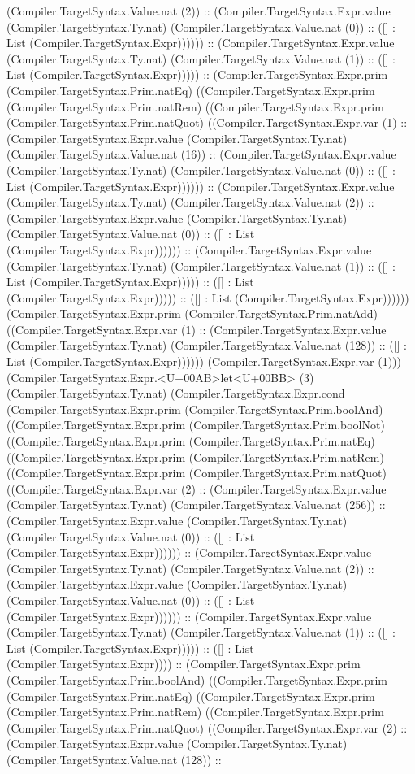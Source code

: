 \documentclass[11pt]{article}
\begin{document}
(Compiler.TargetSyntax.Value.nat (2)) :: (Compiler.TargetSyntax.Expr.value (Compiler.TargetSyntax.Ty.nat) (Compiler.TargetSyntax.Value.nat (0)) :: ([] : List (Compiler.TargetSyntax.Expr)))))) :: (Compiler.TargetSyntax.Expr.value (Compiler.TargetSyntax.Ty.nat) (Compiler.TargetSyntax.Value.nat (1)) :: ([] : List (Compiler.TargetSyntax.Expr))))) :: (Compiler.TargetSyntax.Expr.prim (Compiler.TargetSyntax.Prim.natEq) ((Compiler.TargetSyntax.Expr.prim (Compiler.TargetSyntax.Prim.natRem) ((Compiler.TargetSyntax.Expr.prim (Compiler.TargetSyntax.Prim.natQuot) ((Compiler.TargetSyntax.Expr.var (1) :: (Compiler.TargetSyntax.Expr.value (Compiler.TargetSyntax.Ty.nat) (Compiler.TargetSyntax.Value.nat (16)) :: (Compiler.TargetSyntax.Expr.value (Compiler.TargetSyntax.Ty.nat) (Compiler.TargetSyntax.Value.nat (0)) :: ([] : List (Compiler.TargetSyntax.Expr)))))) :: (Compiler.TargetSyntax.Expr.value (Compiler.TargetSyntax.Ty.nat) (Compiler.TargetSyntax.Value.nat (2)) :: (Compiler.TargetSyntax.Expr.value (Compiler.TargetSyntax.Ty.nat) (Compiler.TargetSyntax.Value.nat (0)) :: ([] : List (Compiler.TargetSyntax.Expr)))))) :: (Compiler.TargetSyntax.Expr.value (Compiler.TargetSyntax.Ty.nat) (Compiler.TargetSyntax.Value.nat (1)) :: ([] : List (Compiler.TargetSyntax.Expr))))) :: ([] : List (Compiler.TargetSyntax.Expr))))) :: ([] : List (Compiler.TargetSyntax.Expr)))))) (Compiler.TargetSyntax.Expr.prim (Compiler.TargetSyntax.Prim.natAdd) ((Compiler.TargetSyntax.Expr.var (1) :: (Compiler.TargetSyntax.Expr.value (Compiler.TargetSyntax.Ty.nat) (Compiler.TargetSyntax.Value.nat (128)) :: ([] : List (Compiler.TargetSyntax.Expr)))))) (Compiler.TargetSyntax.Expr.var (1))) (Compiler.TargetSyntax.Expr.<U+00AB>let<U+00BB> (3) (Compiler.TargetSyntax.Ty.nat) (Compiler.TargetSyntax.Expr.cond (Compiler.TargetSyntax.Expr.prim (Compiler.TargetSyntax.Prim.boolAnd) ((Compiler.TargetSyntax.Expr.prim (Compiler.TargetSyntax.Prim.boolNot) ((Compiler.TargetSyntax.Expr.prim (Compiler.TargetSyntax.Prim.natEq) ((Compiler.TargetSyntax.Expr.prim (Compiler.TargetSyntax.Prim.natRem) ((Compiler.TargetSyntax.Expr.prim (Compiler.TargetSyntax.Prim.natQuot) ((Compiler.TargetSyntax.Expr.var (2) :: (Compiler.TargetSyntax.Expr.value (Compiler.TargetSyntax.Ty.nat) (Compiler.TargetSyntax.Value.nat (256)) :: (Compiler.TargetSyntax.Expr.value (Compiler.TargetSyntax.Ty.nat) (Compiler.TargetSyntax.Value.nat (0)) :: ([] : List (Compiler.TargetSyntax.Expr)))))) :: (Compiler.TargetSyntax.Expr.value (Compiler.TargetSyntax.Ty.nat) (Compiler.TargetSyntax.Value.nat (2)) :: (Compiler.TargetSyntax.Expr.value (Compiler.TargetSyntax.Ty.nat) (Compiler.TargetSyntax.Value.nat (0)) :: ([] : List (Compiler.TargetSyntax.Expr)))))) :: (Compiler.TargetSyntax.Expr.value (Compiler.TargetSyntax.Ty.nat) (Compiler.TargetSyntax.Value.nat (1)) :: ([] : List (Compiler.TargetSyntax.Expr))))) :: ([] : List (Compiler.TargetSyntax.Expr)))) :: (Compiler.TargetSyntax.Expr.prim (Compiler.TargetSyntax.Prim.boolAnd) ((Compiler.TargetSyntax.Expr.prim (Compiler.TargetSyntax.Prim.natEq) ((Compiler.TargetSyntax.Expr.prim (Compiler.TargetSyntax.Prim.natRem) ((Compiler.TargetSyntax.Expr.prim (Compiler.TargetSyntax.Prim.natQuot) ((Compiler.TargetSyntax.Expr.var (2) :: (Compiler.TargetSyntax.Expr.value (Compiler.TargetSyntax.Ty.nat) (Compiler.TargetSyntax.Value.nat (128)) :: 
\end{document}

